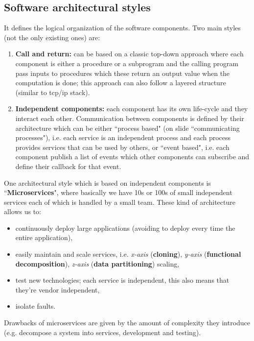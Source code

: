 \documentclass{article}
\begin{document}
\subsection{Software architectural styles}
It defines the logical organization of the software components. Two main styles (not the only existing ones) are:
\begin{enumerate}
    \item \textbf{Call and return:} can be based on a classic top-down approach where each component is either a procedure or a subprogram and the calling program pass inputs to procedures which these return an output value when the computation is done; this approach can also follow a layered structure (similar to tcp/ip stack).
    \item \textbf{Independent components:} each component has its own life-cycle and they interact each other. Communication between components is defined by their architecture which can be either ``process based" (on slide ``communicating processes"), i.e. each service is an independent process and each process provides services that can be used by others, or ``event based", i.e. each component publish a list of events which other components can subscribe and define their callback for that event.
\end{enumerate}

One architectural style which is based on independent components is ``\textbf{Microservices}", where basically we have 10s or 100s of small independent services each of which is handled by a small team. These kind of architecture allows us to:
\begin{itemize}
    \item continuously deploy large applications (avoiding to deploy every time the entire application),
    \item easily maintain and scale services, i.e. \textit{x-axis} (\textbf{cloning}), \textit{y-axis} (\textbf{functional decomposition}), \textit{z-axis} (\textbf{data partitioning})  scaling,
    \item test new technologies; each service is independent, this also means that they're vendor independent,
    \item isolate faults.
\end{itemize}
Drawbacks of microservices are given by the amount of complexity they introduce (e.g. decompose a system into services, development and testing).
\end{document}
